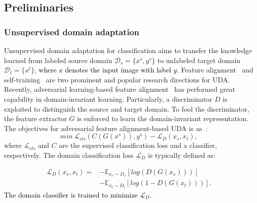 \documentclass[journal]{IEEEtran}
\newcommand{\tcb}{\textcolor{black}}
\newcommand{\tco}{\textcolor{black}}
\begin{document}
\subsection{Preliminaries}
\subsubsection{Unsupervised domain adaptation}
Unsupervised domain adaptation for classification aims to transfer the knowledge learned from labeled source domain $\mathcal{D}_s=\{x^s, y^s\}$ to unlabeled target domain $\mathcal{D}_t=\{x^t\}$, \tco{where $x$ denotes the input image with label $y$}. Feature  alignment~\cite{long2018conditionalCDAN,ganin2016domain_dann,borgwardt2006integratingMMD,chen2019progressive} and self-training~\cite{xu2021cdtransCDTrans,gu2020spherical,mei2020instance,liu2021cycle} are two prominent and popular research directions for UDA. Recently, adversarial learning-based feature alignment~\cite{ganin2016domain_dann} has performed great capability in domain-invariant learning. Particularly, a discriminator $D$ is exploited to distinguish the source and target domain. To fool the discriminator, the feature extractor $G$ is enforced to learn the domain-invariant representation. The objectives for adversarial feature alignment-based UDA is as~\cite{ganin2016domain_dann}:
\begin{equation}
    \label{eq:ada_uda}
     min ~ \mathcal{L}_{cls}(C(G(x^s)), y^s) - \mathcal{L}_D(x_s, x_t),
\end{equation}
where $\mathcal{L}_{cls}$ and $C$ are the supervised classification loss and a classifier, respectively. The domain classification loss $\mathcal{L}_D$ is typically defined as:

\begin{equation}
     \label{eq:l_d}
\begin{split}
    \mathcal{L}_D(x_s, x_t) = & -\mathbb{E}_{x_s \sim D_s}[log(D(G(x_s)))]  \\
    & -\mathbb{E}_{x_t \sim D_t}[log(1-D(G(x_t)))].
\end{split}
\end{equation}
\tcb{The domain classifier is trained to minimize $\mathcal{L}_D$.}
\end{document}
